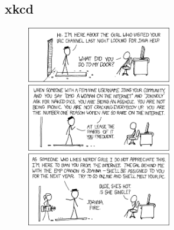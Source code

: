 \documentclass{beamer}
\begin{document}
\subsection{xkcd}
\begin{frame}[plain]
  \begin{figure}
    \begin{center}
      \includegraphics[height=250pt]{pix_plz}
    \end{center}
  \end{figure}
\end{frame}
\end{document}
